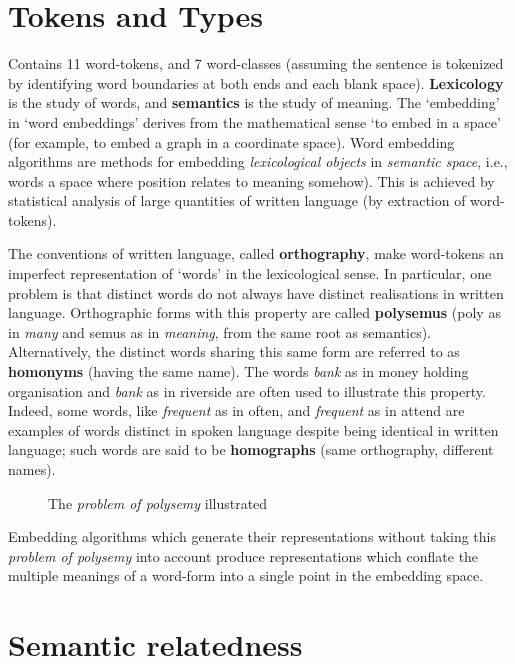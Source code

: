 \section{Tokens and Types}
Contains 11 word-tokens, and 7 word-classes (assuming the sentence is tokenized by identifying word boundaries at both ends and each blank space).
\textbf{Lexicology} is the study of words, and \textbf{semantics} is the study of meaning. The `embedding' in `word embeddings' derives from the mathematical sense `to embed in a space' (for example, to embed a graph in a coordinate space). Word embedding algorithms are methods for embedding \emph{lexicological objects} in \emph{semantic space}, i.e., words a space where position relates to meaning somehow). This is achieved by statistical analysis of large quantities of written language (by extraction of word-tokens).

The conventions of written language, called \textbf{orthography}, make word-tokens an imperfect representation of `words' in the lexicological sense. In particular, one problem is that distinct words do not always have distinct realisations in written language. Orthographic forms with this property are called \textbf{polysemus} (poly as in \emph{many} and semus as in \emph{meaning}, from the same root as semantics). Alternatively, the distinct words sharing this same form are referred to as \textbf{homonyms} (having the same name). The words \emph{bank} as in money holding organisation and \emph{bank} as in riverside are often used to illustrate this property. Indeed, some words, like \emph{frequent} as in often, and \emph{frequent} as in attend are examples of words distinct in spoken language despite being identical in written language; such words are said to be \textbf{homographs} (same orthography, different names).

\begin{figure}[h]
 \centering
 
 \caption{The \emph{problem of polysemy} illustrated}
\end{figure}

Embedding algorithms which generate their representations without taking this \emph{problem of polysemy} into account produce representations which conflate the multiple meanings of a word-form into a single point in the embedding space.

\section{Semantic relatedness}
